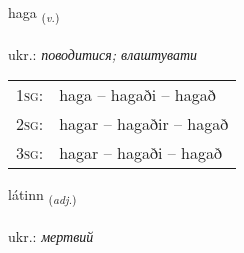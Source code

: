 \documentclass[frontgrid, backgrid]{flacards}\usepackage[]{graphicx}\usepackage[]{xcolor}
\begin{document}
\renewcommand{\flhead}{\vskip5pt \fboxsep=0pt {\small\bfseries\footnotesize Sagnorð | дієслово}}
\renewcommand{\fcfoot}{\vskip5pt \fboxsep=0pt \hspace{2pt}{\small\bfseries\footnotesize 3K}}

\renewcommand{\blhead}{\vskip5pt {\small\bfseries\footnotesize Sagnorð | дієслово }}
\renewcommand{\bcfoot}{\vskip5pt \hspace{2pt}{\small\bfseries\footnotesize 3K}}


{haga \small{\textsubscript{(\textit{v.})}} \\[1ex] %
\textphonetic{[haːɣa]} \\
ukr.: \emph{поводитися; влаштувати} \\  [2ex]
\renewcommand*{\arraystretch}{0.8}
\begin{tabular}{p{1cm}l}
\textsc{1sg}: & haga -- hagaði -- hagað \\ 
\textsc{2sg}: & hagar -- hagaðir -- hagað \\ 
\textsc{3sg}: & hagar -- hagaði -- hagað \\ 
\end{tabular}
}

\renewcommand{\flhead}{\vskip5pt \fboxsep=0pt {\small\bfseries\footnotesize Lýsingarorð | прикметник}}
\renewcommand{\fcfoot}{\vskip5pt \fboxsep=0pt \hspace{2pt}{\small\bfseries\footnotesize 3K}}

\renewcommand{\blhead}{\vskip5pt {\small\bfseries\footnotesize Lýsingarorð | прикметник }}
\renewcommand{\bcfoot}{\vskip5pt \hspace{2pt}{\small\bfseries\footnotesize 3K}}


{látinn \small{\textsubscript{(\textit{adj.})}} \\[1ex] %
\textphonetic{[lauːtɪn]} \\
ukr.: \emph{мертвий} \\  [2ex]
\renewcommand*{\arraystretch}{0.8}
}
\end{document}
